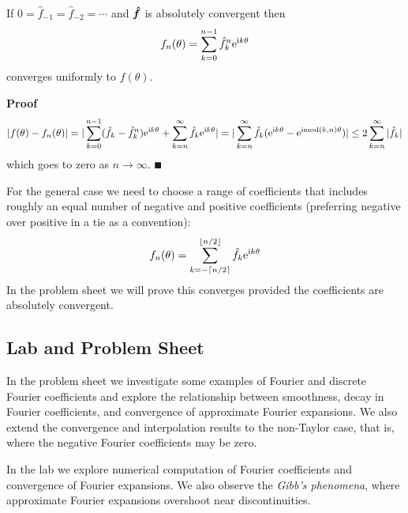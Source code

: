 \begin{theorem} If $0 = \hat f_{-1} = \hat f_{-2} = \ensuremath{\cdots}$ and ${\mbox{\boldmath$\hat f$\unboldmath}}$ is absolutely convergent then
\[
f_n(\theta) = \sum_{k=0}^{n-1} \hat f_k^n {\rm e}^{{\rm i} k \theta}
\]
converges uniformly to $f(\ensuremath{\theta})$.

\end{theorem}
\textbf{Proof}
\begin{align*}
|f(\theta) - f_n(\theta)| = |\sum_{k=0}^{n-1} (\hat f_k - \hat f_k^n) {\rm e}^{{\rm i} k \theta} + \sum_{k=n}^\infty \hat f_k {\rm e}^{{\rm i} k \theta}|
= |\sum_{k=n}^\infty \hat f_k ({\rm e}^{{\rm i} k \theta} - {\rm e}^{{\rm i} {\rm mod}(k,n) \theta})|
\leq 2 \sum_{k=n}^\infty |\hat f_k|
\end{align*}
which goes to zero as $n \ensuremath{\rightarrow} \ensuremath{\infty}$. \ensuremath{\QED}

For the general case we need to choose a range of coefficients that includes roughly an equal number of negative and positive coefficients (preferring negative over positive in a tie as a convention):
\[
f_n(\theta) = \sum_{k=-\lceil n/2\rceil}^{\lfloor n/2\rfloor} \hat f_k {\rm e}^{{\rm i} k \theta}
\]
In the problem sheet we will prove this converges provided the coefficients are absolutely convergent.

\subsection{Lab and Problem Sheet}
In the problem sheet we investigate some examples of Fourier and discrete Fourier coefficients and explore the relationship between smoothness, decay in Fourier coefficients, and convergence of approximate Fourier expansions. We also extend the convergence and interpolation results to the non-Taylor case, that is, where the negative Fourier coefficients may be zero. 

In the lab we explore numerical computation of Fourier coefficients and convergence of Fourier expansions. We also observe the \emph{Gibb's phenomena}, where approximate Fourier expansions overshoot near discontinuities.



